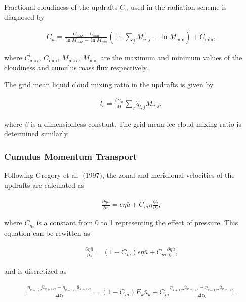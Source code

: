 Fractional cloudiness of the updrafts \(C_u\) used in the radiation
scheme is diagnosed by

\begin{eqnarray}
 C_u = \frac{C_\mathrm{max} - C_\mathrm{min}}{\ln M_\mathrm{max} - \ln M_\mathrm{min}}(\ln \sum_j M_{u,j} - \ln M_\mathrm{min}) + C_\mathrm{min},
\end{eqnarray}

where \(C_\mathrm{max}\), \(C_\mathrm{min}\), \(M_\mathrm{max}\),
\(M_\mathrm{min}\) are the maximum and minimum values of the cloudiness
and cumulus mass flux respectively.

The grid mean liquid cloud mixing ratio in the updrafts is given by

\begin{eqnarray}
 l_c = \frac{\beta C_u}{M} \sum_j \hat{q}_{l,j} M_{u,j},
\end{eqnarray}

where \(\beta\) is a dimensionless constant. The grid mean ice cloud
mixing ratio is determined similarly.

\hypertarget{cumulus-momentum-transport}{%
\subsubsection{Cumulus Momentum
Transport}\label{cumulus-momentum-transport}}

Following Gregory et al.~(1997), the zonal and meridional velocities of
the updrafts are calculated as

\begin{eqnarray}
 \frac{\partial \eta \hat{u}}{\partial z} = \epsilon \eta \bar{u} + C_m \eta \frac{\partial \bar{u}}{\partial z},
\end{eqnarray}

where \(C_m\) is a constant from 0 to 1 representing the effect of
pressure. This equation can be rewitten as

\begin{eqnarray}
 \frac{\partial \eta \hat{u}}{\partial z} = (1-C_m) \epsilon \eta \bar{u} + C_m \frac{\partial \eta \bar{u}}{\partial z},
\end{eqnarray}

and is discretized as

\begin{eqnarray}
  \frac{\eta_{k+1/2} \hat{u}_{k+1/2} - \eta_{k-1/2} \hat{u}_{k-1/2}}{\Delta z_k} = (1-C_m) E_k \bar{u}_k
          + C_m \frac{\eta_{k+1/2} \bar{u}_{k+1/2} - \eta_{k-1/2} \bar{u}_{k-1/2}}{\Delta z_k}.
\end{eqnarray}

